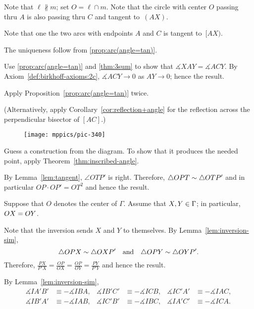 Note that $\ell\nparallel m$;
set $O=\ell\cap m$.
Note that the circle with center $O$ passing thru $A$ is also passing thru $C$ and tangent to~$(AX)$.


Note that one the two arcs with endpoints $A$ and $C$ is tangent to~$[AX)$.

The uniqueness follow from \ref{prop:arc(angle=tan)}.

 Use \ref{prop:arc(angle=tan)} and \ref{thm:3sum} to show that 
$\measuredangle XAY=\measuredangle ACY$.
By Axiom~\ref{def:birkhoff-axioms:2c}, $\measuredangle ACY\to 0$ as $AY\to 0$;
hence the result.

Apply Proposition~\ref{prop:arc(angle=tan)} twice.

(Alternatively, apply Corollary~\ref{cor:reflection+angle} for the reflection across the perpendicular bisector of $[AC]$.)

{

\begin{wrapfigure}{r}{32mm}
\vskip-8mm
\centering
\texttt{[image: mppics/pic-340]}
\end{wrapfigure}

 Guess a construction from the diagram.
To show that it produces the needed point, apply Theorem~\ref{thm:inscribed-angle}.

\setcounter{eqtn}{0}

By Lemma~\ref{lem:tangent}, $\angle OTP'$ is right. 
Therefore, $\triangle OPT\z\sim \triangle OTP'$
and in particular
$OP\cdot OP'=OT^2$
and hence the result.

Suppose that $O$ denotes the center of $\Gamma$.
Assume that $X,Y\z\in \Gamma$;
in particular, $OX\z=OY$.

}

Note that the inversion sends $X$ and $Y$ to themselves.
By Lemma~\ref{lem:inversion-sim},
$$\triangle OPX\z\sim \triangle OXP'
\quad
\text{and}
\quad
\triangle OPY\sim \triangle OYP'.$$
Therefore, 
$\frac{PX}{P'X}=\frac{OP}{OX}=\frac{OP}{OY}=\frac{PY}{P'Y}$
and hence the result.

By Lemma~\ref{lem:inversion-sim},
\begin{align*}
\measuredangle IA'B'&\equiv -\measuredangle IBA,
&
\measuredangle IB'C'&\equiv -\measuredangle ICB,
&
\measuredangle IC'A'&\equiv -\measuredangle IAC,
\\
\measuredangle IB'A'&\equiv -\measuredangle IAB,
&
\measuredangle IC'B'&\equiv -\measuredangle IBC,
&
\measuredangle IA'C'&\equiv -\measuredangle ICA.
\end{align*}

